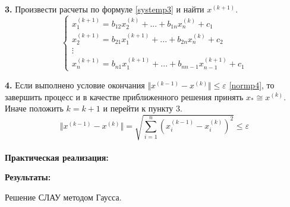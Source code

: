 \documentclass[a4paper, 12pt]{article}   	%
\begin{document}
\textbf{3.} Произвести расчеты по формуле \eqref{systemp3} и найти $x^{(k+1)}$.
\begin{equation}\label{systemp3}
\begin{cases}
x_{1}^{(k+1)} = b_{12} x_{2}^{(k)} + ... + b_{1n} x_{n}^{(k)} + c_1
\\
x_{2}^{(k+1)} = b_{21} x_{1}^{(k+1)} + ... + b_{2n} x_{n}^{(k)} + c_2
\\
\vdots
\\
x_{n}^{(k+1)} = b_{n1}  x_{1}^{(k+1)} + ... + b_{nn-1} x_{n-1}^{(k+1)} + c_1
\end{cases}
\end{equation}

\textbf{4.} Если выполнено условие окончания $\Vert x^{(k-1)} - x^{(k)} \Vert \leq \varepsilon$ \eqref{normp4}, то завершить процесс и в качестве приближенного решения принять $x_{*} \cong x^{(k)}$. Иначе положить $k = k + 1$ и перейти к пункту 3. 
\begin{equation}\label{normp4}
\Vert x^{(k-1)} - x^{(k)} \Vert = \sqrt{\sum_{i=1}^{n} (x_{i}^{(k-1)} - x_{i}^{(k)})^2} \leq \varepsilon
\end{equation}
\\



\textbf{Практическая реализация:}
\hypertarget{lst:gauss}{}

\hypertarget{lst:zeidel}{}



\textbf{Результаты:}

Решение СЛАУ методом Гаусса.
\end{document}
